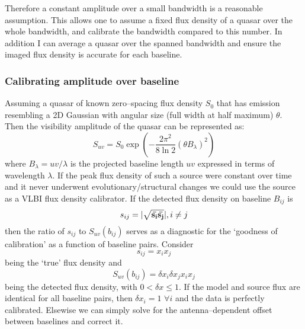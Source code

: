 			Therefore a constant amplitude over a small bandwidth is a reasonable assumption. This allows one to assume a fixed flux density of a quasar over the whole bandwidth, and calibrate the bandwidth compared to this number. In addition I can average a quasar over the spanned bandwidth and ensure the imaged flux density is accurate for each baseline. 

		\subsubsection{Calibrating amplitude over baseline}
			\label{quasaramp_cal}
			Assuming a quasar of known zero--spacing flux density $S_0$ that has emission resembling a 2D Gaussian with angular size (full width at half maximum) $\theta$. Then the visibility amplitude of the quasar can be represented as: 
			\begin{equation}
				S_{uv} = S_0 \exp\left({-\frac{2\pi^2}{8\ln 2}(\theta B_{\lambda})^2}\right)
			\end{equation} 
			where $B_{\lambda} = uv/\lambda$ is the projected baseline length $uv$ expressed in terms of wavelength $\lambda$. If the peak flux density of such a source were constant over time and it never underwent evolutionary/structural changes we could use the source as a VLBI flux density calibrator. If the detected flux density on baseline $B_{ij}$ is $$ s_{ij} = | \sqrt{\bf\bar{s_i} \bar{s_j}} |, i\not=j$$ then the ratio of $s_{ij}$ to $S_{uv}(b_{ij})$ serves as a diagnostic for the `goodness of calibration' as a function of baseline pairs. Consider $$s_{ij} = x_i x_j$$ being the `true' flux density and $$S_{uv}(b_{ij}) = \delta x_i \delta x_j x_i x_j$$ being the detected flux density, with $0<\delta x\le1$. If the model and source flux are identical for all baseline pairs, then $\delta x_i = 1$ $\forall i$ and the data is perfectly calibrated. Elsewise we can simply solve for the antenna--dependent offset between baselines and correct it. 

